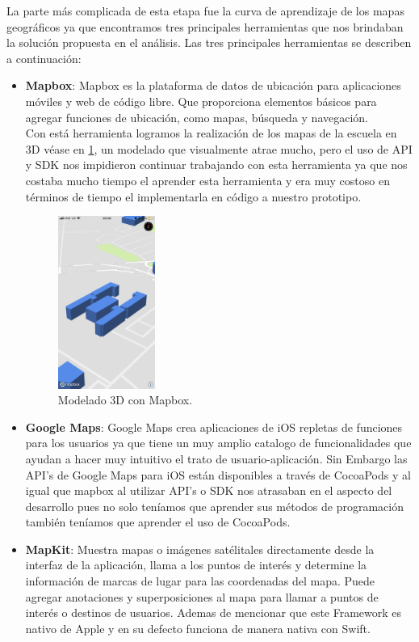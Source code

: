 La parte más complicada de esta etapa fue la curva de aprendizaje de los mapas geográficos ya que encontramos tres principales herramientas que nos brindaban la solución propuesta en el análisis. Las tres principales herramientas se describen a continuación: 
\begin{itemize}
	\item \textbf{Mapbox}: Mapbox es la plataforma de datos de ubicación para aplicaciones móviles y web de código libre. Que proporciona  elementos básicos para agregar funciones de ubicación, como mapas, búsqueda y navegación.\\ Con está herramienta logramos la realización de los mapas de la escuela en 3D véase en \ref{mapbox}, un modelado que visualmente atrae mucho, pero el uso de API y SDK nos impidieron continuar trabajando con esta herramienta ya que nos costaba mucho tiempo el aprender esta herramienta y era muy costoso en términos de tiempo el implementarla en código a nuestro prototipo.
	
	\begin{figure}[h!]
		\begin{center}
			\includegraphics[width=0.3\textwidth]{images/maqueta/mapbox.png}
			\caption{Modelado 3D con Mapbox.}
			\label{mapbox}
		\end{center}
	\end{figure}
	\item  \textbf{Google Maps}: Google Maps crea aplicaciones de iOS repletas de funciones para los usuarios ya que tiene un muy amplio catalogo de funcionalidades que ayudan a hacer muy intuitivo el trato de usuario-aplicación. Sin Embargo las API's de Google Maps para iOS están disponibles a través de CocoaPods y al igual que mapbox al utilizar API's o SDK nos atrasaban en el aspecto del desarrollo pues no solo teníamos que aprender sus métodos de programación también teníamos que  aprender el uso de CocoaPods.
	\item \textbf{MapKit}: Muestra mapas o imágenes satélitales  directamente desde la interfaz de la aplicación, llama a los puntos de interés y determine la información de marcas de lugar para las coordenadas del mapa. Puede agregar anotaciones y superposiciones al mapa para llamar a puntos de interés o destinos de usuarios. Ademas de mencionar que este Framework es nativo de Apple y en su defecto funciona de manera nativa con Swift.
\end{itemize}
